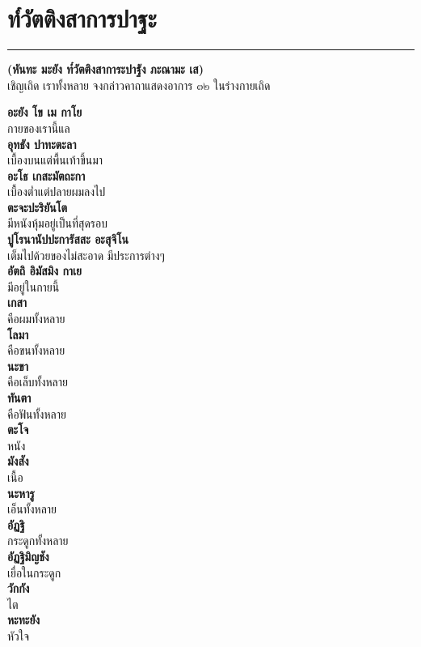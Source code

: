 \documentclass[12pt]{article}
\begin{document}
\pagebreak
\section{ท๎วัตติงสาการปาฐะ}
\hrule
\begin{center}
\textbf{(หันทะ มะยัง ท๎วัตติงสาการะปาฐัง ภะณามะ เส)\\}
เชิญเถิด เราทั้งหลาย จงกล่าวคาถาแสดงอาการ ๓๒ ในร่างกายเถิด
\end{center}
\textbf{อะยัง โข เม กาโย\\}
\indent กายของเรานี้แล\\
\textbf{อุทธัง ปาทะตะลา\\}
\indent เบื้องบนแต่พื้นเท้าขึ้นมา\\
\textbf{อะโธ เกสะมัตถะกา\\}
\indent เบื้องต่ำแต่ปลายผมลงไป\\
\textbf{ตะจะปะริยันโต\\}
\indent มีหนังหุ้มอยู่เป็นที่สุดรอบ\\
\textbf{ปูโรนานัปปะการัสสะ อะสุจิโน\\}
\indent เต็มไปด้วยของไม่สะอาด มีประการต่างๆ\\
\textbf{อัตถิ อิมัสมิง กาเย \\}
\indent มีอยู่ในกายนี้\\
\textbf{เกสา \\}
\indent คือผมทั้งหลาย\\
\textbf{โลมา} \\
\indent คือขนทั้งหลาย\\
\textbf{นะขา} \\
\indent คือเล็บทั้งหลาย\\
\textbf{ทันตา} \\
\indent คือฟันทั้งหลาย\\
\textbf{ตะโจ} \\
\indent หนัง\\
\textbf{มังสัง} \\
\indent เนื้อ\\
\textbf{นะหารู} \\
\indent เอ็นทั้งหลาย\\
\textbf{อัฏฐิ} \\
\indent กระดูกทั้งหลาย\\
\textbf{อัฏฐิมิญชัง} \\
\indent เยื่อในกระดูก\\
\textbf{วักกัง} \\
\indent ไต\\
\textbf{หะทะยัง} \\
\indent หัวใจ\\
\end{document}
